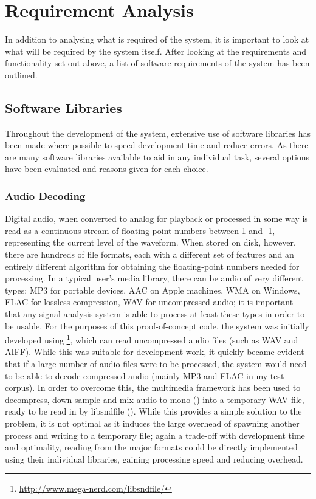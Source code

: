 \section{Requirement Analysis}
In addition to analysing what is required of the system, it is important to look at what will be required by the system itself. After looking at the requirements and functionality set out above, a list of software requirements of the system has been outlined.
\subsection{Software Libraries}
Throughout the development of the system, extensive use of software libraries has been made where possible to speed development time and reduce errors. As there are many software libraries available to aid in any individual task, several options have been evaluated and reasons given for each choice.
\subsubsection{Audio Decoding}
Digital audio, when converted to analog for playback or processed in some way is read as a continuous stream of floating-point numbers between 1 and -1, representing the current level of the waveform. When stored on disk, however, there are hundreds of file formats, each with a different set of features and an entirely different algorithm for obtaining the floating-point numbers needed for processing. In a typical user's media library, there can be audio of very different types: MP3 for portable devices, AAC on Apple machines, WMA on Windows, FLAC for lossless compression, WAV for uncompressed audio; it is important that any signal analysis system is able to process at least these types in order to be usable. For the purposes of this proof-of-concept code, the system was initially developed using \footnote{\url{http://www.mega-nerd.com/libsndfile/}}, which can read uncompressed audio files (such as WAV and AIFF). While this was suitable for development work, it quickly became evident that if a large number of audio files were to be processed, the system would need to be able to decode compressed audio (mainly MP3 and FLAC in my test corpus). In order to overcome this, the  multimedia framework has been used to decompress, down-sample and mix audio to mono () into a temporary WAV file, ready to be read in by libsndfile (). While this provides a simple solution to the problem, it is not optimal as it induces the large overhead of spawning another process and writing to a temporary file; again a trade-off with development time and optimality, reading from the major formats could be directly implemented using their individual libraries, gaining processing speed and reducing overhead.
